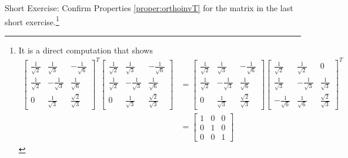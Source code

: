 Short Exercise: Confirm Properties \ref{proper:orthoinvT} for the matrix in the last short exercise.\footnote{It is a direct computation that shows
\begin{align*}
\begin{bmatrix}
\frac{1}{\sqrt{2}} & \frac{1}{\sqrt{3}} & -\frac{1}{\sqrt{6}} \\
\frac{1}{\sqrt{2}} & -\frac{1}{\sqrt{3}} & \frac{1}{\sqrt{6}} \\
0 & \frac{1}{\sqrt{3}} & \frac{\sqrt{2}}{\sqrt{3}}
\end{bmatrix}^T
\begin{bmatrix}
\frac{1}{\sqrt{2}} & \frac{1}{\sqrt{3}} & -\frac{1}{\sqrt{6}} \\
\frac{1}{\sqrt{2}} & -\frac{1}{\sqrt{3}} & \frac{1}{\sqrt{6}} \\
0 & \frac{1}{\sqrt{3}} & \frac{\sqrt{2}}{\sqrt{3}}
\end{bmatrix} &=
\begin{bmatrix}
\frac{1}{\sqrt{2}} & \frac{1}{\sqrt{3}} & -\frac{1}{\sqrt{6}} \\
\frac{1}{\sqrt{2}} & -\frac{1}{\sqrt{3}} & \frac{1}{\sqrt{6}} \\
0 & \frac{1}{\sqrt{3}} & \frac{\sqrt{2}}{\sqrt{3}}
\end{bmatrix}
\begin{bmatrix}
\frac{1}{\sqrt{2}} & \frac{1}{\sqrt{2}} & 0 \\
\frac{1}{\sqrt{3}} & -\frac{1}{\sqrt{3}} & \frac{1}{\sqrt{3}} \\
-\frac{1}{\sqrt{6}} & \frac{1}{\sqrt{6}} & \frac{\sqrt{2}}{\sqrt{3}}
\end{bmatrix}^T \\
&=
\begin{bmatrix}
1 & 0 & 0 \\
0 & 1 & 0 \\
0 & 0 & 1
\end{bmatrix}
\end{align*}
}

